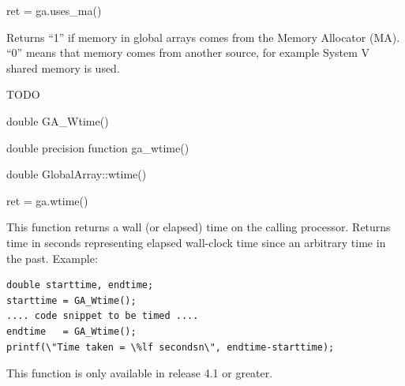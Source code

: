 \documentclass[12pt]{article}
\begin{document}
\begin{pyapi}
\begin{pycode}
ret = ga.uses_ma()
\end{pycode}
\end{pyapi}

\local

\begin{desc}

Returns ``1'' if memory in global arrays comes from the Memory Allocator (MA).
``0'' means that memory comes from another source, for example System V shared
memory is used.

TODO

\end{desc}


\begin{capi}
\begin{ccode}
double GA_Wtime()
\end{ccode}
\end{capi}

\begin{fapi}
\begin{fcode}
double precision function ga_wtime()
\end{fcode}
\end{fapi}

\begin{cxxapi}
\begin{cxxcode}
double GlobalArray::wtime()
\end{cxxcode}
\end{cxxapi}

\begin{pyapi}
\begin{pycode}
ret = ga.wtime()
\end{pycode}
\end{pyapi}

\local

\begin{desc}
This function returns a wall (or elapsed) time on the calling processor.
Returns time in seconds representing elapsed wall-clock time since an arbitrary
time in the past. Example:
\begin{verbatim}
double starttime, endtime;
starttime = GA_Wtime();
.... code snippet to be timed ....
endtime   = GA_Wtime();
printf(\"Time taken = \%lf secondsn\", endtime-starttime);
\end{verbatim}
This function is only available in release 4.1 or greater.
\end{desc}
\end{document}
